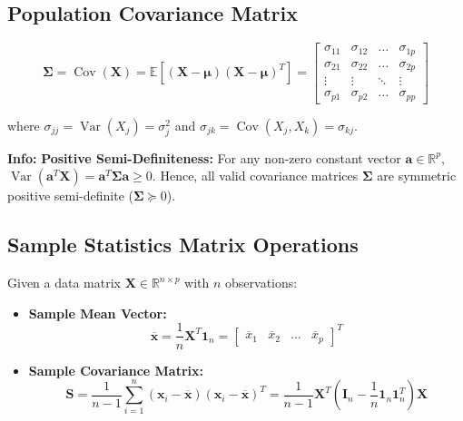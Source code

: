 \documentclass[
]{article}
\begin{document}
\textbf{ }

\subsection{Population Covariance Matrix}

\[\mathbf{\Sigma} = \operatorname{Cov}(\mathbf{X}) = \mathbb{E}\left\lbrack \left( \mathbf{X} - \mathbf{\mu} \right)\left( \mathbf{X} - \mathbf{\mu} \right)^{T} \right\rbrack = \begin{bmatrix}
\sigma_{11} & \sigma_{12} & \ldots & \sigma_{1p} \\
\sigma_{21} & \sigma_{22} & \ldots & \sigma_{2p} \\
 \vdots & \vdots & \ddots & \vdots \\
\sigma_{p1} & \sigma_{p2} & \ldots & \sigma_{pp}
\end{bmatrix}\]

where \(\sigma_{jj} = \operatorname{Var}(X_{j}) = \sigma_{j}^{2}\) and
\(\sigma_{jk} = \operatorname{Cov}(X_{j},X_{k}) = \sigma_{kj}\).

\textbf{Info: } \textbf{Positive Semi-Definiteness:} For any non-zero
constant vector \(\mathbf{a} \in \mathbb{R}^{p}\),
\(\operatorname{Var}(\mathbf{a}^{T}\mathbf{X}) = \mathbf{a}^{T}\mathbf{\Sigma}\mathbf{a} \geq 0\).
Hence, all valid covariance matrices \(\mathbf{\Sigma}\) are symmetric
positive semi-definite (\(\mathbf{\Sigma} \succeq 0\)).

\textbf{ }

\subsection{Sample Statistics Matrix Operations}

Given a data matrix \(\mathbf{X} \in \mathbb{R}^{n \times p}\) with
\(n\) observations:

\begin{itemize}
\item
  \textbf{Sample Mean Vector:}
  \[\overline{\mathbf{x}} = \frac{1}{n}\mathbf{X}^{T}\mathbf{1}_{n} = \begin{bmatrix}
  {\overline{x}}_{1} & {\overline{x}}_{2} & \ldots & {\overline{x}}_{p}
  \end{bmatrix}^{T}\]
\item
  \textbf{Sample Covariance Matrix:}
  \[\mathbf{S} = \frac{1}{n - 1}\sum_{i = 1}^{n}\left( \mathbf{x}_{i} - \overline{\mathbf{x}} \right)\left( \mathbf{x}_{i} - \overline{\mathbf{x}} \right)^{T} = \frac{1}{n - 1}\mathbf{X}^{T}\left( \mathbf{I}_{n} - \frac{1}{n}\mathbf{1}_{n}\mathbf{1}_{n}^{T} \right)\mathbf{X}\]
\end{itemize}
\end{document}
